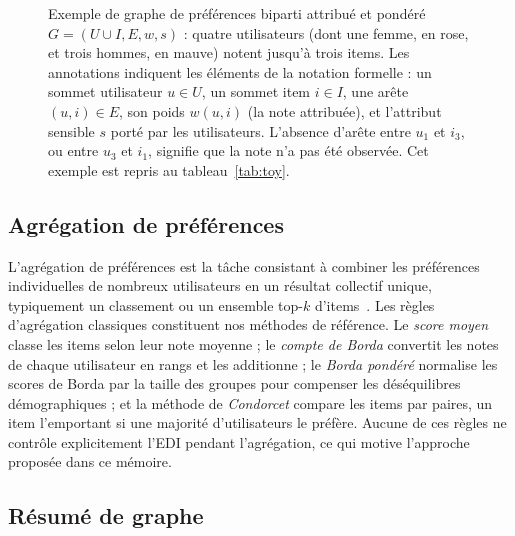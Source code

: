 \documentclass[12pt]{report}
\begin{document}
\begin{figure}[H]
{%
}
\caption{Exemple de graphe de préférences biparti attribué et pondéré
$G = (U \cup I, E, w, s)$ : quatre utilisateurs (dont une femme, en rose,
et trois hommes, en mauve) notent jusqu'à trois items. Les annotations
indiquent les éléments de la notation formelle : un sommet utilisateur
$u \in U$, un sommet item $i \in I$, une arête $(u,i) \in E$, son poids
$w(u,i)$ (la note attribuée), et l'attribut sensible $s$ porté par les
utilisateurs. L'absence d'arête entre $u_1$ et $i_3$, ou entre $u_3$ et
$i_1$, signifie que la note n'a pas été observée. Cet exemple est repris
au tableau~\ref{tab:toy}.}
\label{fig:bipartite-example}
\end{figure}

\subsection{Agrégation de préférences}

L'agrégation de préférences est la tâche consistant à combiner les
préférences individuelles de nombreux utilisateurs en un résultat
collectif unique, typiquement un classement ou un ensemble top-$k$
d'items~\cite{ricci2011recommender}. Les règles d'agrégation classiques
constituent nos méthodes de référence. Le \emph{score moyen} classe les
items selon leur note moyenne ; le \emph{compte de Borda} convertit les
notes de chaque utilisateur en rangs et les additionne ; le \emph{Borda
pondéré} normalise les scores de Borda par la taille des groupes pour
compenser les déséquilibres démographiques ; et la méthode de
\emph{Condorcet} compare les items par paires, un item l'emportant si une
majorité d'utilisateurs le préfère. Aucune de ces règles ne contrôle
explicitement l'EDI pendant l'agrégation, ce qui motive l'approche
proposée dans ce mémoire.

\subsection{Résumé de graphe}
\end{document}
